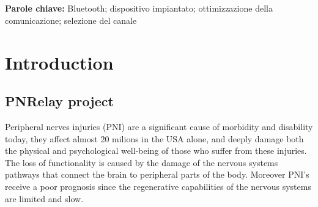\documentclass{Configuration_Files/PoliMi3i_thesis}
\begin{document}
\\
\\
\textbf{Parole chiave:} Bluetooth; dispositivo impiantato; ottimizzazione della comunicazione; selezione del canale

\thispagestyle{empty}
\tableofcontents %
\thispagestyle{empty}
\cleardoublepage

%
%
%    
%

\mainmatter %

\chapter{Introduction}
\section{PNRelay project}
\nocite{*}
Peripheral nerves injuries (PNI) are a significant cause of morbidity and disability today,
they affect almost 20 milions in the USA alone, and deeply damage both the physical and psychological well-being of those who suffer from these injuries. \cite{zhangResearchHotspotsTrends2022}
The loss of functionality is caused by the damage of the nervous systems pathways that connect the brain to peripheral parts of the body.
Moreover PNI's receive a poor prognosis since the regenerative capabilities of the nervous systems are limited and slow.
\end{document}
